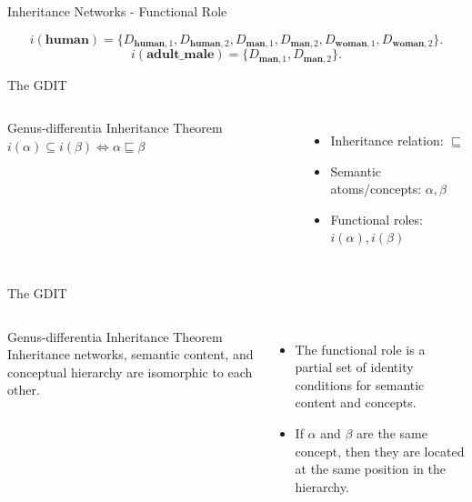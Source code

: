 \documentclass{beamer}
\begin{document}
\begin{frame}{Inheritance Networks - Functional Role}
\centerline{
}
\vspace{.25in}
$$i(\textbf{human})=\{D_{\textbf{human},1},D_{\textbf{human},2},D_{\textbf{man},1},D_{\textbf{man},2},D_{\textbf{woman},1},D_{\textbf{woman},2}\}.$$
$$i(\textbf{adult\_male})=\{D_{\textbf{man},1},D_{\textbf{man},2}\}.$$
\end{frame}

\begin{frame}{The GDIT}
\begin{columns}
\begin{block}{Genus-differentia Inheritance Theorem}
$i(\alpha)\subseteq i(\beta)\Leftrightarrow \alpha\sqsubseteq\beta$
\end{block}
\vspace{.25in}
\begin{itemize}
\item Inheritance relation: $\sqsubseteq$
\item Semantic atoms/concepts: $\alpha,\beta$
\item Functional roles: $i(\alpha),i(\beta)$
\end{itemize}
\end{columns}
\end{frame}


\begin{frame}{The GDIT}
\begin{columns}
\begin{block}{Genus-differentia Inheritance Theorem}
Inheritance networks, semantic content, and conceptual hierarchy are isomorphic to each other.
\end{block}
\vspace{.125in}
\begin{itemize}
\item The functional role is a partial set of identity conditions for semantic content and concepts.
\vspace{.125in}
\item If $\alpha$ and $\beta$ are the same concept, then they are located at the same position in the hierarchy.
\end{itemize}
\vspace{.25in}
\end{columns}
\end{frame}
\end{document}
